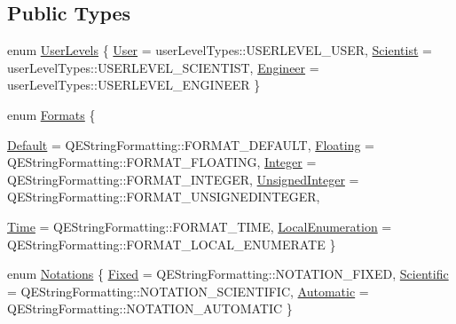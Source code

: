 \subsection*{Public Types}
\begin{DoxyCompactItemize}
\item 
enum \hyperlink{classQERadioButton_abce53396b682b1c32d9909a34620cb50}{UserLevels} \{ \hyperlink{classQERadioButton_abce53396b682b1c32d9909a34620cb50a344f1592866eead3f41facf7045f8674}{User} =  userLevelTypes::USERLEVEL\_\-USER, 
\hyperlink{classQERadioButton_abce53396b682b1c32d9909a34620cb50af0935a04f55bd6957b3de9f0558c56e1}{Scientist} =  userLevelTypes::USERLEVEL\_\-SCIENTIST, 
\hyperlink{classQERadioButton_abce53396b682b1c32d9909a34620cb50a83647a06fe63d13b39959c7236fa980a}{Engineer} =  userLevelTypes::USERLEVEL\_\-ENGINEER
 \}
\item 
enum \hyperlink{classQERadioButton_aa0cfe17ce2d6ebd73254671906060cc7}{Formats} \{ \par
\hyperlink{classQERadioButton_aa0cfe17ce2d6ebd73254671906060cc7a2a042e82e89ee3608fe4a623eb0a789e}{Default} =  QEStringFormatting::FORMAT\_\-DEFAULT, 
\hyperlink{classQERadioButton_aa0cfe17ce2d6ebd73254671906060cc7aea567658a801d20feeb07e352d3c1661}{Floating} =  QEStringFormatting::FORMAT\_\-FLOATING, 
\hyperlink{classQERadioButton_aa0cfe17ce2d6ebd73254671906060cc7a42d6a3979494d980bf18c9abf46c5983}{Integer} =  QEStringFormatting::FORMAT\_\-INTEGER, 
\hyperlink{classQERadioButton_aa0cfe17ce2d6ebd73254671906060cc7ab7a993795e47a29b5835c2a0e9967e89}{UnsignedInteger} =  QEStringFormatting::FORMAT\_\-UNSIGNEDINTEGER, 
\par
\hyperlink{classQERadioButton_aa0cfe17ce2d6ebd73254671906060cc7a1f5c87852e2d89a9a5c0d8194af97815}{Time} =  QEStringFormatting::FORMAT\_\-TIME, 
\hyperlink{classQERadioButton_aa0cfe17ce2d6ebd73254671906060cc7a1f652526a1ded25ab1bad544f03fee0f}{LocalEnumeration} =  QEStringFormatting::FORMAT\_\-LOCAL\_\-ENUMERATE
 \}
\item 
enum \hyperlink{classQERadioButton_a767068fd800eec905334454e97af20ce}{Notations} \{ \hyperlink{classQERadioButton_a767068fd800eec905334454e97af20ceaf2f476b2dbcbcc6214a16a851d7ba5cd}{Fixed} =  QEStringFormatting::NOTATION\_\-FIXED, 
\hyperlink{classQERadioButton_a767068fd800eec905334454e97af20ceaca1ca9454ea98b8774a4f44167b25c6a}{Scientific} =  QEStringFormatting::NOTATION\_\-SCIENTIFIC, 
\hyperlink{classQERadioButton_a767068fd800eec905334454e97af20cea265e9ecd144309452d176f33e98b5547}{Automatic} =  QEStringFormatting::NOTATION\_\-AUTOMATIC
 \}
\item 

\end{DoxyCompactItemize}
